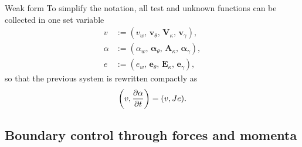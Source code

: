 \documentclass{beamer}
\begin{document}
\begin{frame}{Weak form}
To simplify the notation, all test and unknown functions can be collected in one set variable
\begin{equation*}
\begin{aligned}
v &:= (v_{w},\, \bm{v}_{\theta},\, \bm{V}_{\kappa},\, \bm{v}_{\gamma}),\\
\alpha &:= (\alpha_{w},\, \bm{\alpha}_{\theta},\, \bm{A}_{\kappa},\, \bm{\alpha}_{\gamma}), \\
e &:= (e_{w},\, \bm{e}_{\theta},\, \bm{E}_{\kappa},\, \bm{e}_{\gamma}),
\end{aligned}
\end{equation*}
so that the previous system is rewritten compactly as
\begin{equation*}
\left(v, \diffp{\alpha}{t}\right) = (v, Je).
\end{equation*}

\end{frame}



\subsection{Boundary control through forces and momenta}
\end{document}
